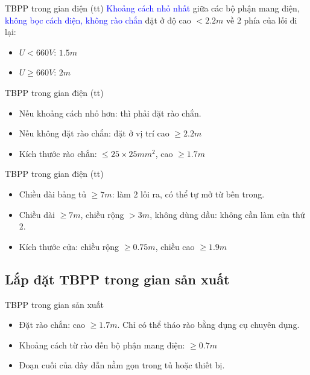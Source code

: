 \documentclass[20pt]{beamer}
\newcommand{\noibat}[1]{\textcolor{blue}{#1}} %
\begin{document}
\begin{frame}{TBPP trong gian điện (tt)}
\justifying
\noibat{Khoảng cách nhỏ nhất} giữa các \alert{bộ phận mang điện}, \noibat{không bọc cách điện, không rào chắn} đặt ở độ cao $<2.2m$ về 2 phía của lối đi lại:
	\begin{itemize}
	\justifying
		\item $U < 660V$: $1.5m$
		
		\item $U \geq 660V$: $2m$
	\end{itemize}
\end{frame}

\begin{frame}{TBPP trong gian điện (tt)}
	\begin{itemize}
	\justifying
		\item Nếu khoảng cách nhỏ hơn: thì phải đặt rào chắn.
		
		\item Nếu không đặt rào chắn: đặt ở vị trí cao $ \geq 2.2m$
		
		\item Kích thước rào chắn: $\leq 25\times 25 mm^2$, cao $\geq 1.7m$
	\end{itemize}
\end{frame}

\begin{frame}{TBPP trong gian điện (tt)}
	\begin{itemize}
	\justifying
		\item Chiều dài bảng tủ $\geq 7m$: làm 2 lối ra, có thể tự mở từ bên trong.
		\item Chiều dài $\geq 7m$, chiều rộng $>3m$, không dùng dầu: không cần làm cửa thứ 2.
		\item Kích thước cửa: chiều rộng $\geq 0.75m$, chiều cao $\geq 1.9m$
	\end{itemize}
\end{frame}

\subsection*{Lắp đặt TBPP trong gian sản xuất}
\begin{frame}{TBPP trong gian sản xuất}
	\begin{itemize}
	\justifying
		\item Đặt rào chắn: cao $\geq 1.7m$. Chỉ có thể tháo rào bằng dụng cụ chuyên dụng.
		
		\item Khoảng cách từ \alert{rào} đến \alert{bộ phận mang điện}: $\geq 0.7m$
		
		\item Đoạn cuối của dây dẫn nằm gọn trong tủ hoặc thiết bị.
	\end{itemize}
\end{frame}
\end{document}
